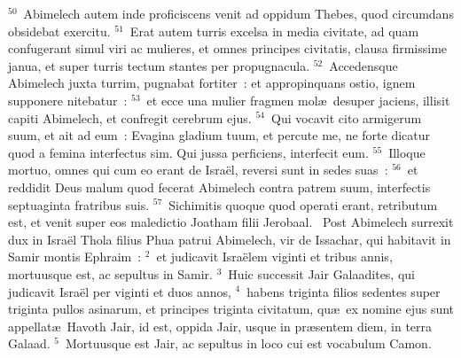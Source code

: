 ${}^{50}$~Abimelech autem inde proficiscens venit ad oppidum Thebes, quod circumdans obsidebat exercitu.
${}^{51}$~Erat autem turris excelsa in media civitate, ad quam confugerant simul viri ac mulieres, et omnes principes civitatis, clausa firmissime janua, et super turris tectum stantes per propugnacula.
${}^{52}$~Accedensque Abimelech juxta turrim, pugnabat fortiter~: et appropinquans ostio, ignem supponere nitebatur~:
${}^{53}$~et ecce una mulier fragmen mol\ae\ desuper jaciens, illisit capiti Abimelech, et confregit cerebrum ejus.
${}^{54}$~Qui vocavit cito armigerum suum, et ait ad eum~: Evagina gladium tuum, et percute me, ne forte dicatur quod a femina interfectus sim. Qui jussa perficiens, interfecit eum.
${}^{55}$~Illoque mortuo, omnes qui cum eo erant de Isra\"el, reversi sunt in sedes suas~:
${}^{56}$~et reddidit Deus malum quod fecerat Abimelech contra patrem suum, interfectis septuaginta fratribus suis.
${}^{57}$~Sichimitis quoque quod operati erant, retributum est, et venit super eos maledictio Joatham filii Jerobaal.
~Post Abimelech surrexit dux in Isra\"el Thola filius Phua patrui Abimelech, vir de Issachar, qui habitavit in Samir montis Ephraim~:
${}^{2}$~et judicavit Isra\"elem viginti et tribus annis, mortuusque est, ac sepultus in Samir.
${}^{3}$~Huic successit Jair Galaadites, qui judicavit Isra\"el per viginti et duos annos,
${}^{4}$~habens triginta filios sedentes super triginta pullos asinarum, et principes triginta civitatum, qu\ae\ ex nomine ejus sunt appellat\ae\ Havoth Jair, id est, oppida Jair, usque in pr\ae sentem diem, in terra Galaad.
${}^{5}$~Mortuusque est Jair, ac sepultus in loco cui est vocabulum Camon.



